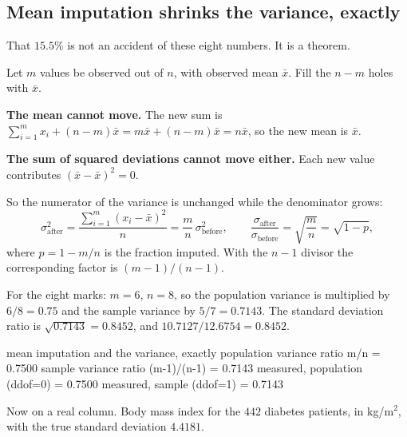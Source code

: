 \documentclass[11pt]{article}
\begin{document}
\subsection{Mean imputation shrinks the variance, exactly}
\label{sec:shrink}

That $15.5\%$ is not an accident of these eight numbers. It is a theorem.

\begin{worked}
Let $m$ values be observed out of $n$, with observed mean $\bar x$. Fill the
$n - m$ holes with $\bar x$.

\textbf{The mean cannot move.} The new sum is
$\sum_{i=1}^m x_i + (n-m)\bar x = m\bar x + (n-m)\bar x = n \bar x$, so the new
mean is $\bar x$.

\textbf{The sum of squared deviations cannot move either.} Each new value
contributes $(\bar x - \bar x)^2 = 0$.

So the numerator of the variance is unchanged while the denominator grows:
\begin{equation}
  \label{eq:shrink}
  \sigma^2_{\text{after}}
  = \frac{\sum_{i=1}^{m}(x_i-\bar x)^2}{n}
  = \frac{m}{n}\,\sigma^2_{\text{before}},
  \qquad
  \frac{\sigma_{\text{after}}}{\sigma_{\text{before}}}
  = \sqrt{\frac{m}{n}} = \sqrt{1-p},
\end{equation}
where $p = 1 - m/n$ is the fraction imputed. With the $n-1$ divisor the
corresponding factor is $(m-1)/(n-1)$.

For the eight marks: $m = 6$, $n = 8$, so the population variance is multiplied
by $6/8 = 0.75$ and the sample variance by $5/7 = 0.7143$. The standard
deviation ratio is $\sqrt{0.7143} = 0.8452$, and $10.7127/12.6754 = 0.8452$.
\end{worked}

\begin{codeout}
mean imputation and the variance, exactly
  population variance ratio  m/n         = 0.7500
  sample     variance ratio  (m-1)/(n-1) = 0.7143
  measured, population (ddof=0)          = 0.7500
  measured, sample     (ddof=1)          = 0.7143
\end{codeout}

Now on a real column. Body mass index for the $442$ diabetes patients, in
kg/m$^2$, with the true standard deviation $4.4181$.
\end{document}

